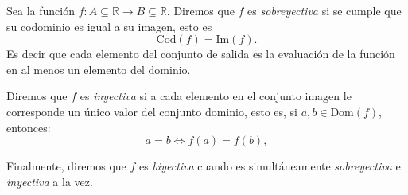\begin{definition}
  
  Sea la funci\'on $f: A \subseteq \mathbb{R} \rightarrow B \subseteq \mathbb{R}$. Diremos que
   $f$ es \textit{sobreyectiva} si se cumple que su codominio es igual a su imagen, esto es
   \begin{equation*}
        \text{Cod}(f)=\text{Im}(f).
    \end{equation*}   Es decir que cada elemento del conjunto de salida es la evaluación de la función en al menos un elemento del dominio.

 Diremos que $f$ es   \textit{inyectiva} si a cada elemento en el conjunto imagen le corresponde un único
    valor del  conjunto dominio, esto es,   si  $a,b\in \text{Dom}(f)$, entonces:
     \begin{equation*}
        a=b \iff f(a)=f(b),
    \end{equation*} 

    Finalmente, diremos que $f$  es \textit{biyectiva} cuando es simultáneamente \textit{sobreyectiva} e \textit{inyectiva} a la vez.
\end{definition}
